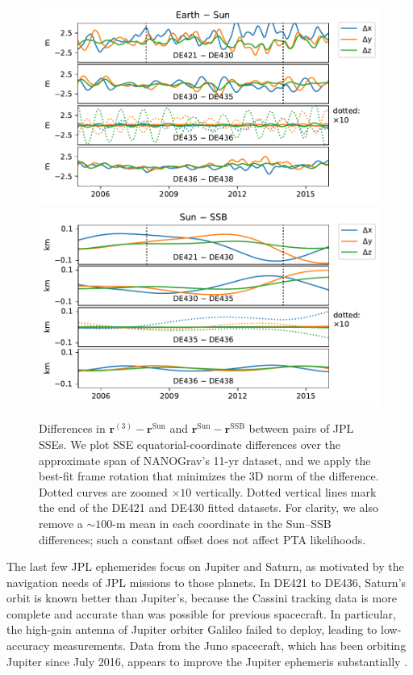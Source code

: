 \documentclass[iop,apj,twocolappendix]{emulateapj}
\begin{document}
\begin{figure}[t]
    \centering
    \includegraphics[width=\columnwidth]{figures/EarthSunDiff.pdf}
    \includegraphics[width=\columnwidth]{figures/SunSSBDiff.pdf}
    \caption{Differences in $\mathbf{r}^{(3)} - \mathbf{r}^\mathrm{Sun}$ and $\mathbf{r}^\mathrm{Sun} - \mathbf{r}^\mathrm{SSB}$ between pairs of JPL SSEs. We plot SSE equatorial-coordinate differences over the approximate span of NANOGrav's 11-yr dataset, and we apply the best-fit frame rotation that minimizes the 3D norm of the difference. Dotted curves are zoomed $\times 10$ vertically. Dotted vertical lines mark the end of the DE421 and DE430 fitted datasets.
    For clarity, we also remove a $\sim 100$-m mean in each coordinate in the Sun--SSB differences; such a constant offset does not affect PTA likelihoods.
    \label{fig:earthsun}}
\end{figure}

The last few JPL ephemerides focus on Jupiter and Saturn, as motivated by the navigation needs of JPL missions to those planets. In DE421 to DE436, Saturn's orbit is known better than Jupiter's, because the Cassini tracking data is more complete and accurate than was possible for previous spacecraft. In particular, the high-gain antenna of Jupiter orbiter Galileo failed to deploy, leading to low-accuracy measurements. Data from the Juno spacecraft, which has been orbiting Jupiter since July 2016, appears to improve the Jupiter ephemeris substantially \citep{2009IPNPR.178C...1F}.
\end{document}
